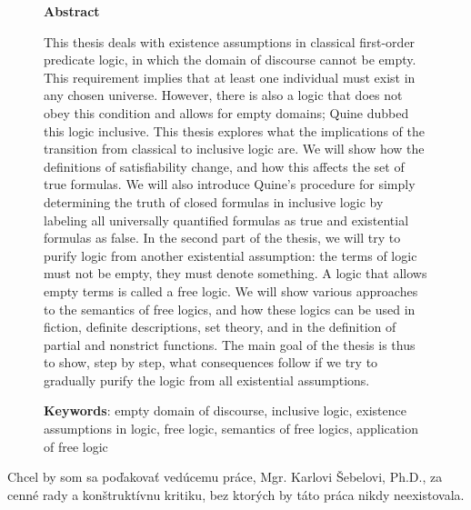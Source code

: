 \documentclass[12pt, letterpaper]{article}
\begin{document}
\begin{figure}[p]
	    \begin{minipage}[t][0.4\textheight][t]{\textwidth}
	         \begin{center}\textbf{Abstract} \end{center}
	      This thesis deals with existence assumptions in classical first-order predicate logic, in which the domain of discourse cannot be empty.
This requirement implies that at least one individual must exist in any chosen universe. However, there is also a logic that does not obey this condition and allows for empty domains; Quine dubbed this logic inclusive. This thesis explores what the implications of the transition from classical to inclusive logic are. We will show how the definitions of satisfiability change, and how this affects the set of true formulas. We will also introduce Quine's procedure for simply determining the truth of closed formulas in inclusive logic by labeling all universally quantified formulas as true and existential formulas as false. In the second part of the thesis, we will try to purify logic from another existential assumption: the terms of logic must not be empty, they must denote something. A logic that allows empty terms is called a free logic. We will show various approaches to the semantics of free logics, and how these logics can be used in fiction, definite descriptions, set theory, and in the definition of partial and nonstrict functions.
The main goal of the thesis is thus to show, step by step, what consequences follow if we try to gradually purify the logic from all existential assumptions.
	    \end{minipage}
	    \begin{minipage}[t][0.05\textheight][t]{\textwidth}
	        \textbf{Keywords}: empty domain of discourse, inclusive logic, existence assumptions in logic, free logic, semantics of free logics, application of free logic
	    \end{minipage}
	    
	\end{figure}
	\clearpage
	\vspace*{\fill}
	\noindent Chcel by som sa poďakovať vedúcemu práce, Mgr. Karlovi Šebelovi, Ph.D., za cenné rady a konštruktívnu kritiku, bez ktorých by táto práca nikdy neexistovala. %
	
	\vspace*{7cm}
	\clearpage
	
	\tableofcontents 
	\pagebreak
	\listofdiagrams 
	\listofusudoks 
	\listoftables
\end{document}
